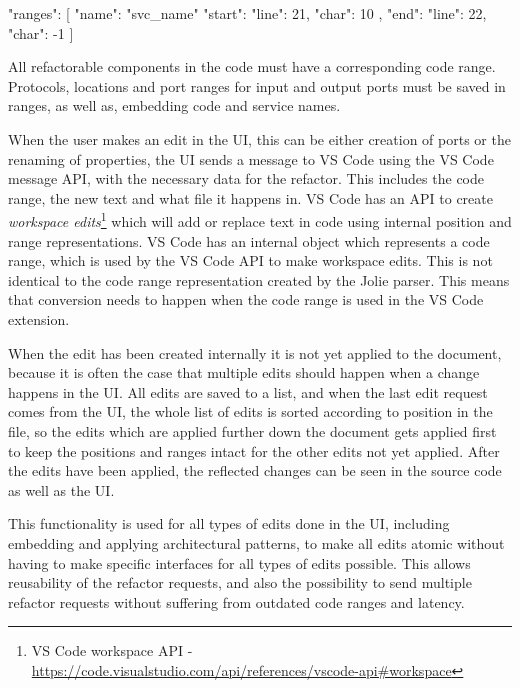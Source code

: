 \begin{jsonlisting}[][caption={JSON representing a code range created by the Jolie parser}, label={lst:code_ranges}]
{
    "ranges": [
        {
            "name": "svc_name"
            "start": {
                "line": 21,
                "char": 10
            },
            "end": {
                "line": 22,
                "char": -1
            }
        }
    ]
}
\end{jsonlisting}

All refactorable components in the code must have a corresponding code range. Protocols,
locations and port ranges for input and output ports must be saved in ranges, as well as, embedding code and service names.

When the user makes an edit in the UI, this can be either creation of ports or the renaming of properties, the UI sends a message to VS Code using the VS Code message API, with the necessary data for the refactor. This includes
the code range, the new text and what file it happens in. VS Code has an API to create \emph{workspace edits}\footnote{VS Code workspace API - \url{https://code.visualstudio.com/api/references/vscode-api\#workspace}} which will add or replace text in code using internal position and range representations.
VS Code has an internal object which represents a code range, which is used by the VS Code API to make workspace edits. This is not identical to the code range representation created by the Jolie parser.
This means that conversion needs to happen when the code range is used in the VS Code extension.

When the edit has been created internally it is not yet applied to the document, because it is often the case that multiple edits should happen when a change happens in the UI.
All edits are saved to a list, and when the last edit request comes from the UI, the whole list of edits is sorted according to position in the file, so the edits which are applied further down the document gets applied first to keep the positions and ranges intact for the other edits not yet applied.
After the edits have been applied, the reflected changes can be seen in the source code as well as the UI.

This functionality is used for all types of edits done in the UI, including embedding and applying architectural patterns, to make all edits atomic without having to make specific interfaces for all types of edits possible. 
This allows reusability of the refactor requests, and also the possibility to send multiple refactor requests without suffering from outdated code ranges and latency.

